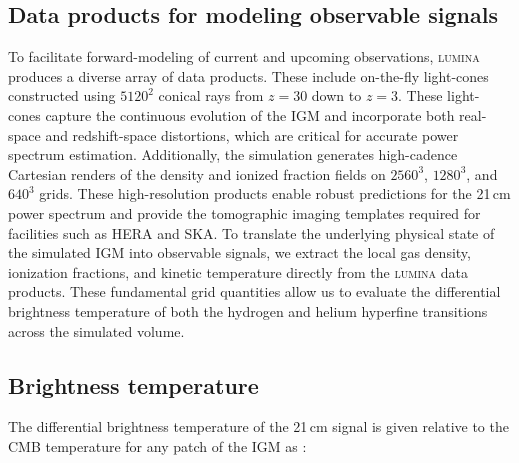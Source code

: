 \documentclass[apj,twocolumn, appendixfloats, twocolappendix, numberedappendix, tighten]{openjournal}
\DeclareRobustCommand{\lumina}{\mbox{\textsc{lumina}}\xspace}
\begin{document}
\subsection{Data products for modeling observable signals}

To facilitate forward-modeling of current and upcoming observations, \lumina produces a diverse array of data products. These include on-the-fly light-cones constructed using $5120^2$ conical rays from $z=30$ down to $z=3$. These light-cones capture the continuous evolution of the IGM and incorporate both real-space and redshift-space distortions, which are critical for accurate power spectrum estimation. Additionally, the simulation generates high-cadence Cartesian renders of the  density and ionized fraction fields on $2560^3$, $1280^3$, and $640^3$ grids. These high-resolution products enable robust predictions for the 21\,cm power spectrum and provide the tomographic imaging templates required for facilities such as HERA and SKA. To translate the underlying physical state of the simulated IGM into observable signals, we extract the local gas density, ionization fractions, and kinetic temperature directly from the \lumina data products. These fundamental grid quantities allow us to evaluate the differential brightness temperature of both the hydrogen and helium hyperfine transitions across the simulated volume.


\subsection{Brightness temperature}

The differential brightness temperature of the 21\,cm signal is given relative to the CMB temperature for any patch of the IGM as \citep[][]{Furlanetto2006, Pritchard2012}:
\end{document}
